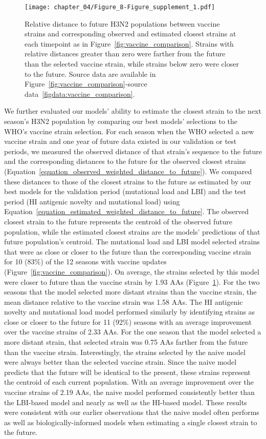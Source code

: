 \begin{figure}
  \texttt{[image: chapter\_04/Figure\_8-Figure\_supplement\_1.pdf]}
  \caption{
    Relative distance to future H3N2 populations between vaccine strains and corresponding observed and estimated closest strains at each timepoint as in Figure~\ref{fig:vaccine_comparison}.
    Strains with relative distances greater than zero were farther from the future than the selected vaccine strain, while strains below zero were closer to the future.
    Source data are available in Figure~\ref{fig:vaccine_comparison}-source data~\ref{figdata:vaccine_comparison}.
  }
  \label{fig:vaccine_comparison_relative_distance}
\end{figure}

We further evaluated our models' ability to estimate the closest strain to the next season's H3N2 population by comparing our best models' selections to the WHO's vaccine strain selection.
For each season when the WHO selected a new vaccine strain and one year of future data existed in our validation or test periods, we measured the observed distance of that strain's sequence to the future and the corresponding distances to the future for the observed closest strains (Equation~\ref{equation_observed_weighted_distance_to_future}).
We compared these distances to those of the closest strains to the future as estimated by our best models for the validation period (mutational load and LBI) and the test period (HI antigenic novelty and mutational load) using Equation~\ref{equation_estimated_weighted_distance_to_future}.
The observed closest strain to the future represents the centroid of the observed future population, while the estimated closest strains are the models' predictions of that future population's centroid.
The mutational load and LBI model selected strains that were as close or closer to the future than the corresponding vaccine strain for 10 (83\%) of the 12 seasons with vaccine updates (Figure~\ref{fig:vaccine_comparison}).
On average, the strains selected by this model were closer to future than the vaccine strain by 1.93 AAs (Figure~\ref{fig:vaccine_comparison_relative_distance}).
For the two seasons that the model selected more distant strains than the vaccine strain, the mean distance relative to the vaccine strain was 1.58 AAs.
The HI antigenic novelty and mutational load model performed similarly by identifying strains as close or closer to the future for 11 (92\%) seasons with an average improvement over the vaccine strains of 2.33 AAs.
For the one season that the model selected a more distant strain, that selected strain was 0.75 AAs farther from the future than the vaccine strain.
Interestingly, the strains selected by the naive model were always better than the selected vaccine strain.
Since the naive model predicts that the future will be identical to the present, these strains represent the centroid of each current population.
With an average improvement over the vaccine strains of 2.19 AAs, the naive model performed consistently better than the LBI-based model and nearly as well as the HI-based model.
These results were consistent with our earlier observations that the naive model often performs as well as biologically-informed models when estimating a single closest strain to the future.

